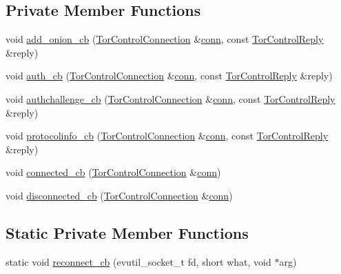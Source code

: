 \subsection*{Private Member Functions}
\begin{DoxyCompactItemize}
\item 
void \mbox{\hyperlink{class_tor_controller_a78b762c14a006b2f509261a95963ff67}{add\+\_\+onion\+\_\+cb}} (\mbox{\hyperlink{class_tor_control_connection}{Tor\+Control\+Connection}} \&\mbox{\hyperlink{class_tor_controller_a0cd0abc08230a17743b1bfa22196a7ed}{conn}}, const \mbox{\hyperlink{class_tor_control_reply}{Tor\+Control\+Reply}} \&reply)
\item 
void \mbox{\hyperlink{class_tor_controller_ae36bc33cb3088384517c68f71e9944ce}{auth\+\_\+cb}} (\mbox{\hyperlink{class_tor_control_connection}{Tor\+Control\+Connection}} \&\mbox{\hyperlink{class_tor_controller_a0cd0abc08230a17743b1bfa22196a7ed}{conn}}, const \mbox{\hyperlink{class_tor_control_reply}{Tor\+Control\+Reply}} \&reply)
\item 
void \mbox{\hyperlink{class_tor_controller_a86f1396b9f242183ffe777e0951eb997}{authchallenge\+\_\+cb}} (\mbox{\hyperlink{class_tor_control_connection}{Tor\+Control\+Connection}} \&\mbox{\hyperlink{class_tor_controller_a0cd0abc08230a17743b1bfa22196a7ed}{conn}}, const \mbox{\hyperlink{class_tor_control_reply}{Tor\+Control\+Reply}} \&reply)
\item 
void \mbox{\hyperlink{class_tor_controller_aee36fcd1cd60d7f4eb007d909894b1c3}{protocolinfo\+\_\+cb}} (\mbox{\hyperlink{class_tor_control_connection}{Tor\+Control\+Connection}} \&\mbox{\hyperlink{class_tor_controller_a0cd0abc08230a17743b1bfa22196a7ed}{conn}}, const \mbox{\hyperlink{class_tor_control_reply}{Tor\+Control\+Reply}} \&reply)
\item 
void \mbox{\hyperlink{class_tor_controller_a59d56a1525a08235b07dd9eadbae0d1f}{connected\+\_\+cb}} (\mbox{\hyperlink{class_tor_control_connection}{Tor\+Control\+Connection}} \&\mbox{\hyperlink{class_tor_controller_a0cd0abc08230a17743b1bfa22196a7ed}{conn}})
\item 
void \mbox{\hyperlink{class_tor_controller_a81392f33f0c7e069762668ec3a757075}{disconnected\+\_\+cb}} (\mbox{\hyperlink{class_tor_control_connection}{Tor\+Control\+Connection}} \&\mbox{\hyperlink{class_tor_controller_a0cd0abc08230a17743b1bfa22196a7ed}{conn}})
\end{DoxyCompactItemize}
\subsection*{Static Private Member Functions}
\begin{DoxyCompactItemize}
\item 
static void \mbox{\hyperlink{class_tor_controller_a2fa9614b4fa0e24c57f443b3c56f835c}{reconnect\+\_\+cb}} (evutil\+\_\+socket\+\_\+t fd, short what, void $\ast$arg)
\end{DoxyCompactItemize}
